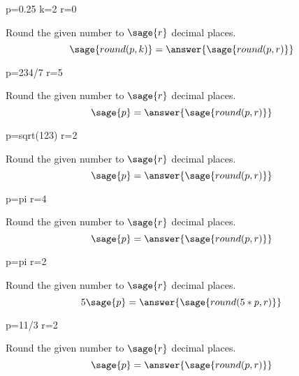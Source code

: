 \documentclass{ximera}
\begin{document}
\begin{problem}
\begin{sagesilent}
p=0.25
k=2
r=0
\end{sagesilent}
Round the given number to $\sage{r}$ decimal places.
$$\sage{round(p,k)}=\answer{\sage{round(p,r)}}$$
\end{problem}


\begin{problem}
\begin{sagesilent}
p=234/7
r=5
\end{sagesilent}
Round the given number to $\sage{r}$ decimal places.
$$\sage{p}=\answer{\sage{round(p,r)}}$$
\end{problem}

\begin{problem}
\begin{sagesilent}
p=sqrt(123)
r=2
\end{sagesilent}
Round the given number to $\sage{r}$ decimal places.
$$\sage{p}=\answer{\sage{round(p,r)}}$$
\end{problem}


\begin{problem}
\begin{sagesilent}
p=pi
r=4
\end{sagesilent}
Round the given number to $\sage{r}$ decimal places.
$$\sage{p}=\answer{\sage{round(p,r)}}$$
\end{problem}


\begin{problem}
\begin{sagesilent}
p=pi
r=2
\end{sagesilent}
Round the given number to $\sage{r}$ decimal places.
$$5\sage{p}=\answer{\sage{round(5*p,r)}}$$
\end{problem}


\begin{problem}
\begin{sagesilent}
p=11/3
r=2
\end{sagesilent}
Round the given number to $\sage{r}$ decimal places.
$$\sage{p}=\answer{\sage{round(p,r)}}$$
\end{problem}
\end{document}
